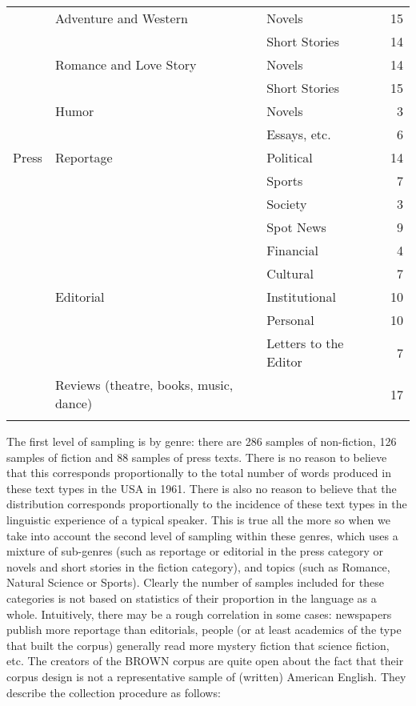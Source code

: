 \begin{table}[!htbp]
{\begin{tabular}{lllr}
   &   Adventure and Western   &   Novels   &   15 \\
   &      &   Short Stories   &   14 \\
   &   Romance and Love Story   &   Novels   &   14 \\
   &      &   Short Stories   &   15 \\
   &   Humor   &   Novels   &   3 \\
   &      &   Essays, etc.   &   6 \\
Press   &   Reportage   &   Political   &   14 \\
   &      &   Sports   &   7 \\
   &      &   Society   &   3 \\
   &      &   Spot News   &   9 \\
   &      &   Financial   &   4 \\
   &      &   Cultural   &   7 \\
   &   Editorial   &   Institutional   &   10 \\
   &      &   Personal   &   10 \\
   &      &   Letters to the Editor   &   7 \\
   &   Reviews (theatre, books, music, dance)   &      &   17 \\
  \lspbottomrule
 \end{tabular}}
\end{table}

The first level of sampling is by genre: there are 286 samples of non-fiction, 126 samples of fiction and 88 samples of press texts. There is no reason to believe that this corresponds proportionally to the total number of words produced in these text types in the USA in 1961. There is also no reason to believe that the distribution corresponds proportionally to the incidence of these text types in the linguistic experience of a typical speaker. This is true all the more so when we take into account the second level of sampling within these genres, which uses a mixture of sub-genres (such as reportage or editorial in the press category or novels and short stories in the fiction category), and topics (such as Romance, Natural Science or Sports). Clearly the number of samples included for these categories is not based on statistics of their proportion in the language as a whole. Intuitively, there may be a rough correlation in some cases: newspapers publish more reportage than editorials, people (or at least academics of the type that built the corpus) generally read more mystery fiction that science fiction, etc. The creators of the BROWN corpus are quite open about the fact that their corpus design is not a representative sample of (written) American English. They describe the collection procedure as follows:

